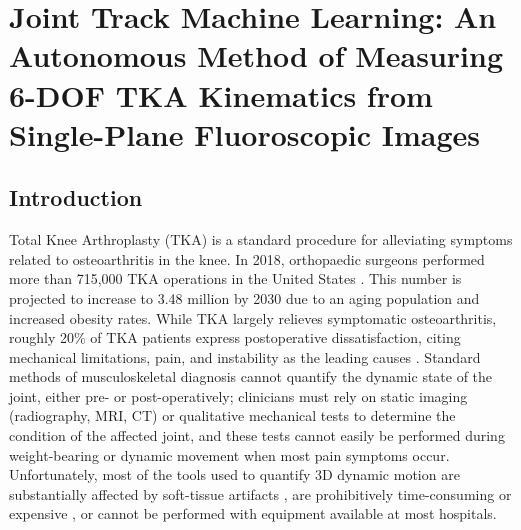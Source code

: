 \chapter{Joint Track Machine Learning: An Autonomous Method of Measuring 6-DOF TKA Kinematics from Single-Plane Fluoroscopic Images}
\label{sec:jtml}
\section{Introduction}
Total Knee Arthroplasty (TKA) is a standard procedure for alleviating symptoms related to osteoarthritis in the knee.
In 2018, orthopaedic surgeons performed more than 715,000 TKA operations in the United States \cite{agencyforhealthcareresearchandqualityHCUPFastStats}.
This number is projected to increase to 3.48 million by 2030 \cite{kurtzProjectionsPrimaryRevision2007} due to an aging population and increased obesity rates.
While TKA largely relieves symptomatic osteoarthritis, roughly 20\% of TKA patients express postoperative dissatisfaction, citing mechanical limitations, pain, and instability as the leading causes \cite{bakerRolePainFunction2007,bournePatientSatisfactionTotal2010,scottPredictingDissatisfactionFollowing2010}.
Standard methods of musculoskeletal diagnosis cannot quantify the dynamic state of the joint, either pre- or post-operatively; clinicians must rely on static imaging (radiography, MRI, CT) or qualitative mechanical tests to determine the condition of the affected joint, and these tests cannot easily be performed during weight-bearing or dynamic movement when most pain symptoms occur.
Unfortunately, most of the tools used to quantify 3D dynamic motion are substantially affected by soft-tissue artifacts \cite{gaoInvestigationSoftTissue2008,stagniQuantificationSoftTissue2005,linEffectsSoftTissue2016}, are prohibitively time-consuming or expensive \cite{daemsValidationThreedimensionalTotal2016}, or cannot be performed with equipment available at most hospitals.

